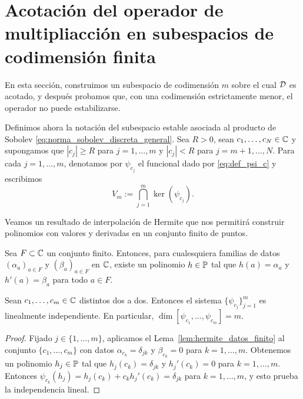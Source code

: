 \section{Acotación del operador de multipliacción en subespacios de codimensión finita}

En esta sección, construimos un subespacio de codimensión $m$ sobre el cual $\mathcal{D}$ es acotado, y después probamos que, con una codimensión estrictamente menor, el operador no puede estabilizarse.

Definimos ahora la notación del subespacio estable asociada al producto de Sobolev \eqref{eq:norma_sobolev_discreta_general}.
Sea $R>0$, sean $c_1,\dots,c_N\in\mathbb{C}$ y supongamos que $|c_j|\ge R$ para $j=1,\dots,m$ y $|c_j|<R$ para $j=m+1,\dots,N$.
Para cada $j=1,\dots,m$, denotamos por $\psi_{c_j}$ el funcional dado por \eqref{eq:def_psi_c} y escribimos
\begin{equation}\label{eq:def_vout}
	V_m:=\bigcap_{j=1}^m\ker(\psi_{c_j}).
\end{equation}

Veamos un resultado de interpolación de Hermite \cite{Dav75} que nos permitirá construir polinomios con valores y derivadas en un conjunto finito de puntos.

\begin{lem}\label{lem:hermite_datos_finito}
	Sea $F\subset\mathbb{C}$ un conjunto finito. Entonces, para cualesquiera familias de datos $(\alpha_a)_{a\in F}$ y $(\beta_a)_{a\in F}$ en $\mathbb{C}$, existe un polinomio $h\in\mathbb{P}$ tal que $h(a)=\alpha_a$ y $h'(a)=\beta_a$ para todo $a\in F$.
\end{lem}

\begin{lem}\label{lem:independencia_funcionales_psi}
	Sean $c_1,\dots,c_m\in\mathbb{C}$ distintos dos a dos. Entonces el sistema $\{\psi_{c_j}\}_{j=1}^m$ es linealmente independiente. En particular, $\dim[\psi_{c_1},\dots,\psi_{c_m}]=m$.
\end{lem}

\begin{proof}
	Fijado $j\in\{1,\dots,m\}$, aplicamos el Lema~\ref{lem:hermite_datos_finito} al conjunto $\{c_1,\dots,c_m\}$ con datos $\alpha_{c_k}=\delta_{jk}$ y $\beta_{c_k}=0$ para $k=1,\dots,m$. Obtenemos un polinomio $h_j\in\mathbb{P}$ tal que $h_j(c_k)=\delta_{jk}$ y $h_j'(c_k)=0$ para $k=1,\dots,m$. Entonces $\psi_{c_k}(h_j)=h_j(c_k)+c_kh_j'(c_k)=\delta_{jk}$ para $k=1,\dots,m$,
	y esto prueba la independencia lineal.
\end{proof}

